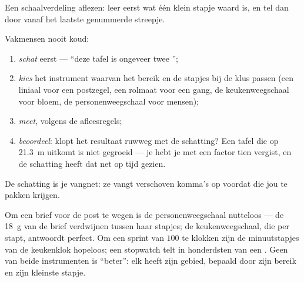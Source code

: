 \begin{omfigure}

{\small Een schaalverdeling aflezen: leer eerst wat één klein stapje
waard is, en tel dan door vanaf het laatste genummerde streepje.}
\end{omfigure}

\begin{method}\label{met:g6:measurement-in-science:estimate}
Vakmensen  nooit koud:
\begin{enumerate}
  \item \emph{schat} eerst --- ``deze tafel is ongeveer twee
        '';
  \item \emph{kies} het instrument waarvan het bereik en de stapjes
        bij de klus passen (een liniaal voor een postzegel, een
        rolmaat voor een gang, de keukenweegschaal voor bloem, de
        personenweegschaal voor mensen);
  \item \emph{meet}, volgens de afleesregels;
  \item \emph{beoordeel}: klopt het resultaat ruwweg met de
        schatting? Een tafel die op \qty{21.3}{m} uitkomt is niet
        gegroeid --- je hebt je met een factor tien vergist, en de
        schatting heeft dat net op tijd gezien.
\end{enumerate}
De schatting is je vangnet: ze vangt verschoven komma's op voordat die
jou te pakken krijgen.
\end{method}

\begin{example}\label{ex:g6:measurement-in-science:choose}
Om een brief voor de post te wegen is de personenweegschaal nutteloos
--- de \qty{18}{g} van de brief verdwijnen tussen haar stapjes; de
keukenweegschaal, die per  stapt, antwoordt perfect. Om een sprint
van $100$  te klokken zijn de minuutstapjes van de keukenklok
hopeloos; een stopwatch telt in honderdsten van een . Geen van
beide instrumenten is ``beter'': elk heeft zijn gebied, bepaald door
zijn bereik en zijn kleinste stapje.
\end{example}


